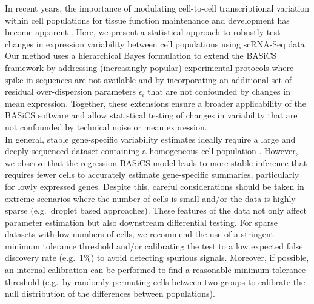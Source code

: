In recent years, the importance of modulating cell-to-cell transcriptional variation within cell populations for tissue function maintenance and development has become apparent \citep{BaharHalpern2015, Mojtahedi2016, Goolam2016}. Here, we present a statistical approach to robustly test changes in expression variability between cell populations using scRNA-Seq data. Our method uses a hierarchical Bayes formulation to extend the BASiCS framework by addressing (increasingly popular) experimental protocols where spike-in sequences are not available and by incorporating an additional set of residual over-dispersion parameters $\epsilon_i$ that are not confounded by changes in mean expression. Together, these extensions ensure a broader applicability of the BASiCS software and allow statistical testing of changes in variability that are not confounded by technical noise or mean expression.  \\ 

In general, stable gene-specific variability estimates ideally require a large and deeply sequenced dataset containing a homogeneous cell population \citep[the use of unique molecular identifiers for quantifying transcript counts can also improve variability estimation, see][]{Grun2014}. However, we observe that the regression BASiCS model leads to more stable inference that requires fewer cells to accurately estimate gene-specific summaries, particularly for lowly expressed genes. Despite this, careful considerations should be taken in extreme scenarios where the number of cells is small and/or the data is highly sparse (e.g.~droplet based approaches). These features of the data not only affect parameter estimation but also downstream differential testing. For sparse datasets with low numbers of cells, we recommend the use of a stringent minimum tolerance threshold and/or calibrating the test to a low expected false discovery rate (e.g.~1\%) to avoid detecting spurious signals. Moreover, if possible, an internal calibration can be performed to find a reasonable minimum tolerance threshold (e.g.~by randomly permuting cells between two groups to calibrate the null distribution of the differences between populations). \\

